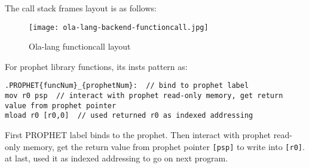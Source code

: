 The call stack frames layout is as follows:

\begin{figure}[!htp]
    \centering
    \texttt{[image: ola-lang-backend-functioncall.jpg]}
    \caption{Ola-lang functioncall layout}
    \label{fig:ola-lang-backend-functioncall}
\end{figure}

For prophet library functions, its insts pattern as:
\begin{lstlisting}[language={}]
.PROPHET{funcNum}_{prophetNum}:  // bind to prophet label
mov r0 psp  // interact with prophet read-only memory, get return value from prophet pointer
mload r0 [r0,0]  // used returned r0 as indexed addressing
\end{lstlisting}

First PROPHET label binds to the prophet. Then interact with prophet read-only memory, get the return value from prophet pointer \texttt{[psp]} to write into \texttt{[r0]}.
at last, used it as indexed addressing to go on next program.